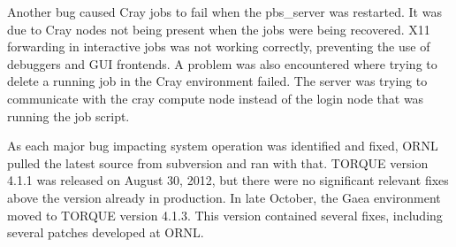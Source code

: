 Another bug caused Cray jobs to fail when the pbs_server was restarted.  It was
due to Cray nodes not being present when the jobs were being recovered.  X11
forwarding in interactive jobs was not working correctly, preventing the use of
debuggers and GUI frontends.  A problem was also encountered where trying to
delete a running job in the Cray environment failed.  The server was trying to
communicate with the cray compute node instead of the login node that was
running the job script.

As each major bug impacting system operation was identified and fixed, ORNL
pulled the latest source from subversion and ran with that.  TORQUE version
4.1.1 was released on August 30, 2012, but there were no significant relevant
fixes above the version already in production.  In late October, the Gaea
environment moved to TORQUE version 4.1.3.  This version contained several
fixes, including several patches developed at ORNL.
